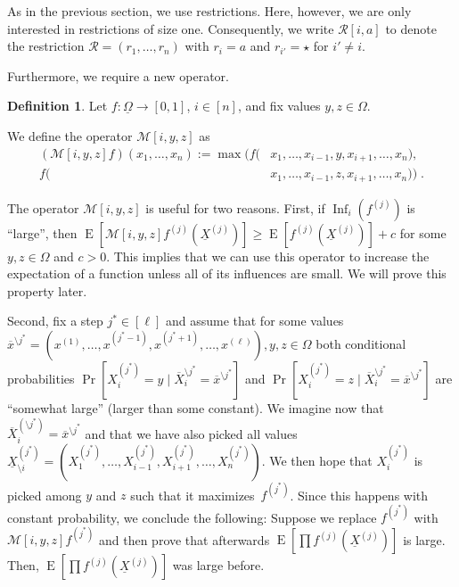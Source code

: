 \documentclass{daj}
\newcommand{\1}{\mathbbm{1}}
\theoremstyle{plain}
\theoremstyle{definition}
\newtheorem{definition}[theorem]{Definition}
\DeclareMathOperator*{\EE}{E}
\DeclareMathOperator{\Inf}{Inf}
\newcommand{\cR}{\mathcal{R}}
\begin{document}
\medskip

As in the previous section, we use restrictions.
Here, however, we are only interested in restrictions of size one.
Consequently, we write $\cR[i,a]$ to denote 
the restriction $\cR = (r_1,\ldots,r_n)$
with $r_i = a$ and $r_{i'} = \star$ for $i' \neq i$.

Furthermore, we require a new operator.
\begin{definition}
Let $f: \underline{\Omega} \to [0, 1]$, $i \in [n]$,
and fix values $y, z \in \Omega$.

We define the operator $\mathcal{M}[i,y,z]$ as
\begin{align*}
(\mathcal{M}[i,y,z]f)(x_1, \ldots, x_n) :=
	\max \bigl( f(&x_1, \ldots, x_{i-1}, y, x_{i+1},\ldots, x_n), \\
                    f(&x_1, \ldots, x_{i-1}, z, x_{i+1}, \ldots, x_n) \bigr) \; .
\end{align*}
\end{definition}

The operator $\mathcal{M}[i,y,z]$ is useful for two reasons.
First, if $\Inf_i(f^{(j)})$ is ``large'', then
$\EE\left[\mathcal{M}[i,y,z]f^{(j)}(\underline{X}^{(j)})\right] \geq
\EE[f^{(j)}(\underline{X}^{(j)})]+c$
for some $y,z \in \Omega$ and $c > 0$.  This implies that we can use this
operator to increase the expectation of a function unless all of its
influences are small. We will prove this property later.

Second, fix a step $j^* \in [\ell]$ and assume that for some values
$\overline{x}^{\setminus j^*} = (x^{(1)}, \ldots, x^{(j^*-1)}, \allowbreak
x^{(j^*+1)}, \ldots,
x^{(\ell)}), y, z \in \Omega$
both conditional probabilities
$\Pr[X_i^{(j^*)} = y \mid \overline{X}_i^{\setminus j^*} = \overline{x}^{\setminus
  j^*}]$
and
$\Pr[X_i^{(j^*)} = z \mid \overline{X}_i^{\setminus j^*} = \overline{x}^{\setminus
  j^*}]$ are ``somewhat large'' (larger than some constant).
We imagine now that 
$\overline{X}_i^{(\setminus j^*)} = \overline{x}^{\setminus j^*}$
and that we have also picked all values
$\underline{X}^{(j^*)}_{\setminus i} = (X_{1}^{(j^*)},\ldots,X_{i-1}^{(j^*)},
X_{i+1}^{(j^*)},\ldots,X_{n}^{(j^*)})$.
We then hope that $X^{(j^*)}_i$ is picked among $y$ and $z$ such that it
maximizes~$f^{(j^*)}$.  Since this happens with constant probability, we
conclude the following: Suppose we replace $f^{(j^*)}$ with
$\mathcal{M}[i,y,z]f^{(j^*)}$ and then prove that afterwards
$\EE[\prod f^{(j)}(\underline{X}^{(j)})]$ is large.  Then,
$\EE[\prod f^{(j)}(\underline{X}^{(j)})]$ was large before.
\end{document}
